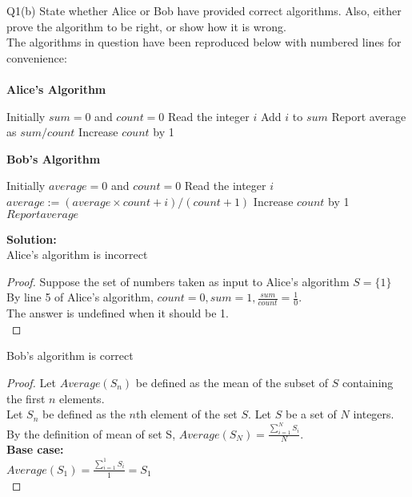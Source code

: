 \begin{problem}
  {Q1(b)}
  State whether Alice or Bob have provided correct algorithms.
  Also, either prove the algorithm to be right, or show how it is wrong.\\
  The algorithms in question have been reproduced below with numbered lines for convenience: \\
  \vspace{10pt}\\
  \textbf{Alice's Algorithm}
  \begin{algorithmic}[1]
    \STATE Initially $sum = 0$ and $count = 0$
    \STATE Read the integer $i$
    \STATE Add $i$ to $sum$
    \STATE Report average as $sum / count$
    \STATE Increase $count$ by 1
    \ENDWHILE
  \end{algorithmic}
  \vspace{10pt}
  \textbf{Bob's Algorithm}
  \begin{algorithmic}[1]
    \STATE Initially $average = 0$ and $count = 0$
    \STATE Read the integer $i$
    \STATE $average := (average \times count + i) / (count + 1)$
    \STATE Increase $count$ by 1
    \STATE $Report average$
    \ENDWHILE
  \end{algorithmic}
  \textbf{Solution:}\\
  \noindent
  Alice's algorithm is incorrect
  \begin{proof}
      Suppose the set of numbers taken as input to Alice's algorithm $S=\{1\}$ \\
      By line 5 of Alice's algorithm, $count=0,sum=1,\frac{sum}{count} = \frac{1}{0}$. \\
      The answer is undefined when it should be 1. \\
  \end{proof}
  \noindent
  Bob's algorithm is correct
  \begin{proof}
      Let $Average(S_n)$ be defined as the mean of the subset of $S$ containing the first $n$ elements. \\
      Let $S_n$ be defined as the $n$th element of the set $S$.
      Let $S$ be a set of $N$ integers. \\
      By the definition of mean of set S, $Average(S_N) = \frac{\sum_{i=1}^{N} S_i}{N}$. \\
      \textbf{Base case:} \\
      $Average(S_1) = \frac{\sum_{i=1}^{1} S_i}{1} = S_1$ \\

\end{proof}
\end{problem}
